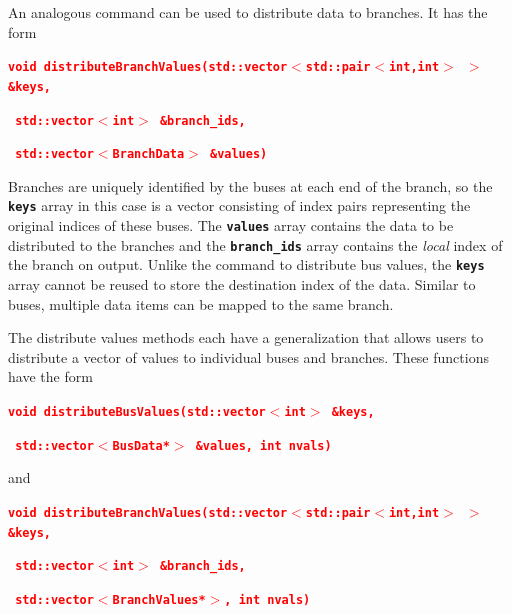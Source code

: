\documentclass[12pt]{report} %
\begin{document}
An analogous command can be used to distribute data to branches. It has the form

\textcolor{red}{\texttt{\textbf{void distributeBranchValues(std::vector$\boldsymbol{\mathrm{<}}$std::pair$\boldsymbol{\mathrm{<}}$int,int$\boldsymbol{\mathrm{>}}$ $\boldsymbol{\mathrm{>}}$ \&keys,}}}

\textcolor{red}{\texttt{\textbf{                            std::vector$\boldsymbol{\mathrm{<}}$int$\boldsymbol{\mathrm{>}}$ \&branch\_ids,}}}

\textcolor{red}{\texttt{\textbf{                            std::vector$\boldsymbol{\mathrm{<}}$BranchData$\boldsymbol{\mathrm{>}}$ \&values)}}}

Branches are uniquely identified by the buses at each end of the branch, so the \texttt{\textbf{keys}} array in this case is a vector consisting of index pairs representing the original indices of these buses. The \texttt{\textbf{values}} array contains the data to be distributed to the branches and the \texttt{\textbf{branch\_ids}} array contains the \textit{local} index of the branch on output. Unlike the command to distribute bus values, the \texttt{\textbf{keys}} array cannot be reused to store the destination index of the data. Similar to buses, multiple data items can be mapped to the same branch.

The distribute values methods each have a generalization that allows users to distribute a vector of values to individual buses and branches. These functions have the form

\textcolor{red}{\texttt{\textbf{void distributeBusValues(std::vector$\boldsymbol{\mathrm{<}}$int$\boldsymbol{\mathrm{>}}$ \&keys,}}}

\textcolor{red}{\texttt{\textbf{                         std::vector$\boldsymbol{\mathrm{<}}$BusData*$\boldsymbol{\mathrm{>}}$ \&values, int nvals)}}}

and

\textcolor{red}{\texttt{\textbf{void distributeBranchValues(std::vector$\boldsymbol{\mathrm{<}}$std::pair$\boldsymbol{\mathrm{<}}$int,int$\boldsymbol{\mathrm{>}}$ $\boldsymbol{\mathrm{>}}$ \&keys,}}}

\textcolor{red}{\texttt{\textbf{                            std::vector$\boldsymbol{\mathrm{<}}$int$\boldsymbol{\mathrm{>}}$ \&branch\_ids,}}}

\textcolor{red}{\texttt{\textbf{                            std::vector$\boldsymbol{\mathrm{<}}$BranchValues*$\boldsymbol{\mathrm{>}}$, int nvals)}}}
\end{document}

